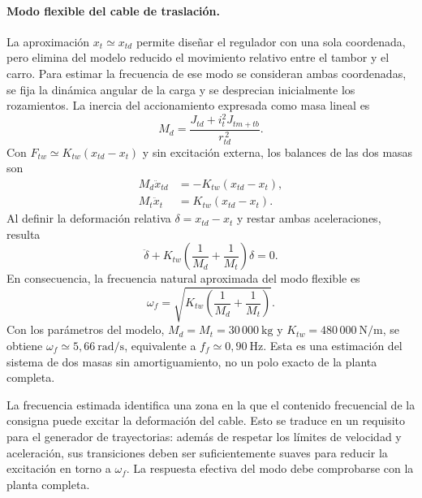 \documentclass[a4paper,10pt,onecolumn,journal]{ieeeconf}
\numberwithin{equation}{section}
\begin{document}
	\paragraph{Modo flexible del cable de traslación.}
	La aproximación $x_t\simeq x_{td}$ permite diseñar el regulador con una
	sola coordenada, pero elimina del modelo reducido el movimiento relativo
	entre el tambor y el carro. Para estimar la frecuencia de ese modo se
	consideran ambas coordenadas, se fija la dinámica angular de la carga
	y se desprecian inicialmente los rozamientos. La inercia del
	accionamiento expresada como masa lineal es
	\begin{equation}
		M_d=\frac{J_{td}+i_t^2J_{tm+tb}}{r_{td}^{\,2}}.
	\end{equation}
	Con $F_{tw}\simeq K_{tw}(x_{td}-x_t)$ y sin excitación externa, los
	balances de las dos masas son
	\begin{align}
		M_d\ddot x_{td}&=-K_{tw}(x_{td}-x_t),\\
		M_t\ddot x_t&=K_{tw}(x_{td}-x_t).
	\end{align}
	Al definir la deformación relativa $\delta=x_{td}-x_t$ y restar ambas
	aceleraciones, resulta
	\begin{equation}
		\ddot\delta+
		K_{tw}\left(\frac{1}{M_d}+\frac{1}{M_t}\right)\delta=0.
	\end{equation}
	En consecuencia, la frecuencia natural aproximada del modo flexible es
	\begin{equation}
		\omega_f=
		\sqrt{K_{tw}\left(\frac{1}{M_d}+\frac{1}{M_t}\right)}.
		\label{eq:frecuencia-flexible-carro}
	\end{equation}
	Con los parámetros del modelo, $M_d=M_t=30\,000~\mathrm{kg}$ y
	$K_{tw}=480\,000~\mathrm{N/m}$, se obtiene
	$\omega_f\simeq5{,}66~\mathrm{rad/s}$, equivalente a
	$f_f\simeq0{,}90~\mathrm{Hz}$. Esta es una estimación del sistema de dos
	masas sin amortiguamiento, no un polo exacto de la planta completa.
	
	La frecuencia estimada identifica una zona en la que el contenido
	frecuencial de la consigna puede excitar la deformación del cable.
	Esto se traduce en un requisito para el generador de trayectorias:
	además de respetar los límites de velocidad y aceleración, sus
	transiciones deben ser suficientemente suaves para reducir la
	excitación en torno a $\omega_f$. La respuesta efectiva del modo debe
	comprobarse con la planta completa.
	
\end{document}
